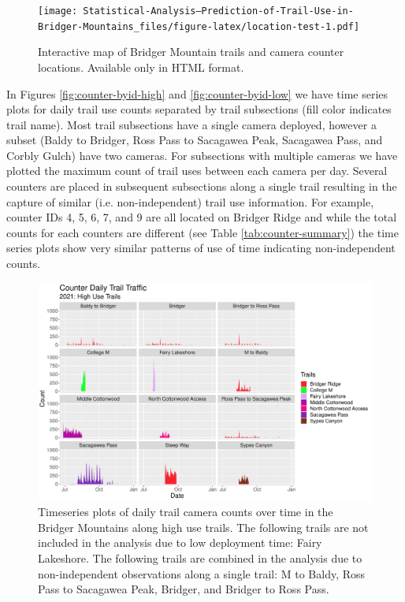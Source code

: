 \documentclass[
]{book}
\begin{document}
\begin{figure}
\centering
\texttt{[image: Statistical-Analysis--Prediction-of-Trail-Use-in-Bridger-Mountains\_files/figure-latex/location-test-1.pdf]}
\caption{\label{fig:location-test}Interactive map of Bridger Mountain trails and camera counter locations. Available only in HTML format.}
\end{figure}

In Figures \autoref{fig:counter-byid-high} and
\ref{fig:counter-byid-low} we have time series plots for daily trail
use counts separated by trail subsections (fill color indicates trail
name). Most trail subsections have a single camera deployed, however a
subset (Baldy to Bridger, Ross Pass to Sacagawea Peak, Sacagawea Pass,
and Corbly Gulch) have two cameras. For subsections with multiple
cameras we have plotted the maximum count of trail uses between each
camera per day. Several counters are placed in subsequent subsections
along a single trail resulting in the capture of similar (i.e.
non-independent) trail use information. For example, counter IDs 4, 5,
6, 7, and 9 are all located on Bridger Ridge and while the total counts
for each counters are different (see Table \ref{tab:counter-summary})
the time series plots show very similar patterns of use of time
indicating non-independent counts.

\begin{figure}

{\centering \includegraphics[width=1\linewidth]{../figures/Counter_bySubSection_TS_highuse} 

}

\caption{Timeseries plots of daily trail camera counts over time in the Bridger Mountains along high use trails. The following trails are not included in the analysis due to low deployment time:  Fairy Lakeshore. The following trails are combined in the analysis due to non-independent observations along a single trail: M to Baldy, Ross Pass to Sacagawea Peak, Bridger, and Bridger to Ross Pass.}\label{fig:counter-byid-high}
\end{figure}
\end{document}
